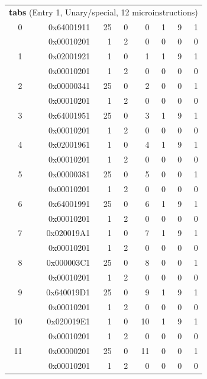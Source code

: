 \begin{longtable}{r r r r r r r r}
\multicolumn{8}{l}{\textbf{tabs} (Entry 1, Unary/special, 12 microinstructions)} \\
0 & 0x64001911 & 25 & 0 & 0 & 1 & 9 & 1 \\
  & 0x00010201 & 1 & 2 & 0 & 0 & 0 & 0 \\
1 & 0x02001921 & 1 & 0 & 1 & 1 & 9 & 1 \\
  & 0x00010201 & 1 & 2 & 0 & 0 & 0 & 0 \\
2 & 0x00000341 & 25 & 0 & 2 & 0 & 0 & 1 \\
  & 0x00010201 & 1 & 2 & 0 & 0 & 0 & 0 \\
3 & 0x64001951 & 25 & 0 & 3 & 1 & 9 & 1 \\
  & 0x00010201 & 1 & 2 & 0 & 0 & 0 & 0 \\
4 & 0x02001961 & 1 & 0 & 4 & 1 & 9 & 1 \\
  & 0x00010201 & 1 & 2 & 0 & 0 & 0 & 0 \\
5 & 0x00000381 & 25 & 0 & 5 & 0 & 0 & 1 \\
  & 0x00010201 & 1 & 2 & 0 & 0 & 0 & 0 \\
6 & 0x64001991 & 25 & 0 & 6 & 1 & 9 & 1 \\
  & 0x00010201 & 1 & 2 & 0 & 0 & 0 & 0 \\
7 & 0x020019A1 & 1 & 0 & 7 & 1 & 9 & 1 \\
  & 0x00010201 & 1 & 2 & 0 & 0 & 0 & 0 \\
8 & 0x000003C1 & 25 & 0 & 8 & 0 & 0 & 1 \\
  & 0x00010201 & 1 & 2 & 0 & 0 & 0 & 0 \\
9 & 0x640019D1 & 25 & 0 & 9 & 1 & 9 & 1 \\
  & 0x00010201 & 1 & 2 & 0 & 0 & 0 & 0 \\
10 & 0x020019E1 & 1 & 0 & 10 & 1 & 9 & 1 \\
  & 0x00010201 & 1 & 2 & 0 & 0 & 0 & 0 \\
11 & 0x00000201 & 25 & 0 & 11 & 0 & 0 & 1 \\
  & 0x00010201 & 1 & 2 & 0 & 0 & 0 & 0 \\


\end{longtable}

